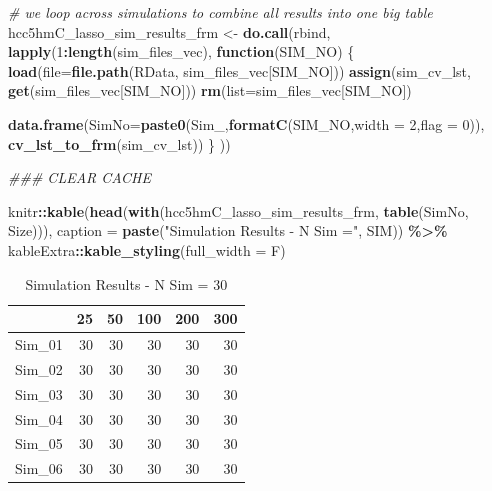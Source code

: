 \documentclass[
]{book}
\newenvironment{Shaded}{\begin{snugshade}}{\end{snugshade}}
\newcommand{\CommentTok}[1]{\textcolor[rgb]{0.56,0.35,0.01}{\textit{#1}}}
\newcommand{\ControlFlowTok}[1]{\textcolor[rgb]{0.13,0.29,0.53}{\textbf{#1}}}
\newcommand{\DataTypeTok}[1]{\textcolor[rgb]{0.13,0.29,0.53}{#1}}
\newcommand{\DecValTok}[1]{\textcolor[rgb]{0.00,0.00,0.81}{#1}}
\newcommand{\KeywordTok}[1]{\textcolor[rgb]{0.13,0.29,0.53}{\textbf{#1}}}
\newcommand{\NormalTok}[1]{#1}
\newcommand{\OperatorTok}[1]{\textcolor[rgb]{0.81,0.36,0.00}{\textbf{#1}}}
\newcommand{\StringTok}[1]{\textcolor[rgb]{0.31,0.60,0.02}{#1}}
\begin{document}
\begin{Shaded}
\begin{Highlighting}[]
\CommentTok{\# we loop across simulations to combine all results into one big table}
\NormalTok{hcc5hmC\_lasso\_sim\_results\_frm <{-}}\StringTok{ }\KeywordTok{do.call}\NormalTok{(}\StringTok{\textquotesingle{}rbind\textquotesingle{}}\NormalTok{, }\KeywordTok{lapply}\NormalTok{(}\DecValTok{1}\OperatorTok{:}\KeywordTok{length}\NormalTok{(sim\_files\_vec),}
 \ControlFlowTok{function}\NormalTok{(SIM\_NO) \{}
  \KeywordTok{load}\NormalTok{(}\DataTypeTok{file=}\KeywordTok{file.path}\NormalTok{(}\StringTok{\textquotesingle{}RData\textquotesingle{}}\NormalTok{, sim\_files\_vec[SIM\_NO]))}
  \KeywordTok{assign}\NormalTok{(}\StringTok{\textquotesingle{}sim\_cv\_lst\textquotesingle{}}\NormalTok{, }\KeywordTok{get}\NormalTok{(sim\_files\_vec[SIM\_NO]))}
  \KeywordTok{rm}\NormalTok{(}\DataTypeTok{list=}\NormalTok{sim\_files\_vec[SIM\_NO])}
  
  \KeywordTok{data.frame}\NormalTok{(}\DataTypeTok{SimNo=}\KeywordTok{paste0}\NormalTok{(}\StringTok{\textquotesingle{}Sim\_\textquotesingle{}}\NormalTok{,}\KeywordTok{formatC}\NormalTok{(SIM\_NO,}\DataTypeTok{width =} \DecValTok{2}\NormalTok{,}\DataTypeTok{flag =} \DecValTok{0}\NormalTok{)), }\KeywordTok{cv\_lst\_to\_frm}\NormalTok{(sim\_cv\_lst))}
\NormalTok{\} }
\NormalTok{)) }
\end{Highlighting}
\end{Shaded}

\begin{Shaded}
\begin{Highlighting}[]
\CommentTok{\#\#\# CLEAR CACHE}
 
\NormalTok{knitr}\OperatorTok{::}\KeywordTok{kable}\NormalTok{(}\KeywordTok{head}\NormalTok{(}\KeywordTok{with}\NormalTok{(hcc5hmC\_lasso\_sim\_results\_frm, }\KeywordTok{table}\NormalTok{(SimNo, Size))),}
  \DataTypeTok{caption =} \KeywordTok{paste}\NormalTok{(}\StringTok{"Simulation Results {-} N Sim ="}\NormalTok{, SIM)) }\OperatorTok{\%>\%}
\StringTok{   }\NormalTok{kableExtra}\OperatorTok{::}\KeywordTok{kable\_styling}\NormalTok{(}\DataTypeTok{full\_width =}\NormalTok{ F)}
\end{Highlighting}
\end{Shaded}

\begin{table}

\caption{\label{tab:hcc5hmC-glmnetSuite-sum-table}Simulation Results - N Sim = 30}
\centering
\begin{tabular}[t]{l|r|r|r|r|r}
\hline
  & 25 & 50 & 100 & 200 & 300\\
\hline
Sim\_01 & 30 & 30 & 30 & 30 & 30\\
\hline
Sim\_02 & 30 & 30 & 30 & 30 & 30\\
\hline
Sim\_03 & 30 & 30 & 30 & 30 & 30\\
\hline
Sim\_04 & 30 & 30 & 30 & 30 & 30\\
\hline
Sim\_05 & 30 & 30 & 30 & 30 & 30\\
\hline
Sim\_06 & 30 & 30 & 30 & 30 & 30\\
\hline
\end{tabular}
\end{table}
\end{document}
